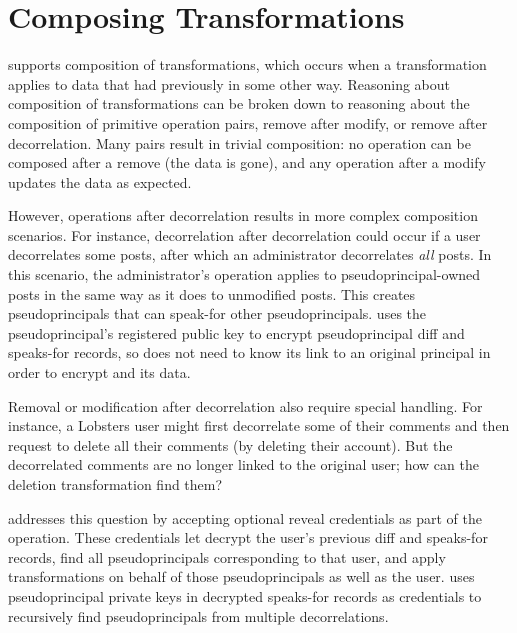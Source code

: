 \section{Composing \Xxing Transformations}
\label{s:composition}

\sys supports composition of \xxing transformations, which occurs when a
transformation applies to data that \sys had previously \xxed in
some other way.
%
Reasoning about composition of transformations can be broken down to reasoning
about the composition of primitive operation pairs, \eg remove after
modify, or remove after decorrelation.
%
Many pairs result in trivial composition: no operation can be composed after a
remove (the data is gone), and any operation after a modify updates the
data as expected. %

However, operations after decorrelation results in more complex composition scenarios.
%
For instance, decorrelation after decorrelation could occur if a user
decorrelates some posts, after which an administrator decorrelates \emph{all}
posts. In this scenario, the administrator's \xxing operation applies to
pseudoprincipal-owned posts in the same way as it does to unmodified posts. This
creates pseudoprincipals that can speak-for other pseudoprincipals.  \sys uses
the pseudoprincipal's registered public key to encrypt pseudoprincipal diff and
speaks-for records, so \sys does not need to know its link to an original
principal in order to encrypt and \xx its data.
%

%
%

Removal or modification after decorrelation also require special handling. For
instance, a Lobsters user might first decorrelate some of their comments and
then request to delete all their comments (\eg by deleting their account).
%
But the decorrelated comments are no
longer linked to the original user; how can the deletion transformation find
them?
%
\begin{comment}
%
\end{comment}
%
\sys addresses this question by accepting optional reveal credentials as part of
the \xx operation.
%
These credentials let \sys decrypt the user's previous diff and speaks-for
records, find all pseudoprincipals corresponding to that user, and apply \xxing
transformations on behalf of those pseudoprincipals as well as the user.
%
\sys uses pseudoprincipal private keys in decrypted speaks-for records as
credentials to recursively find pseudoprincipals from multiple decorrelations.

